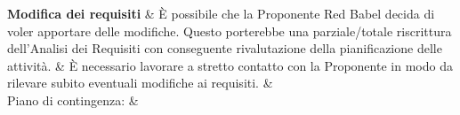 \documentclass[PianoDiProgetto.tex]{subfiles}
\begin{document}
\begin{longtabu}
	
	 \textbf{Modifica dei requisiti} 
	&
	{\small È possibile che la Proponente Red Babel decida di voler apportare delle modifiche. Questo porterebbe una parziale/totale riscrittura dell'Analisi dei Requisiti con conseguente rivalutazione della pianificazione delle attività.}
	&
	{\small È necessario lavorare a stretto contatto con la Proponente in modo da rilevare subito eventuali modifiche ai requisiti.}
	&
	  \\
	 Piano di contingenza:
	&
	\\
	\hhline{====}
	
	
\end{longtabu}
\end{document}
